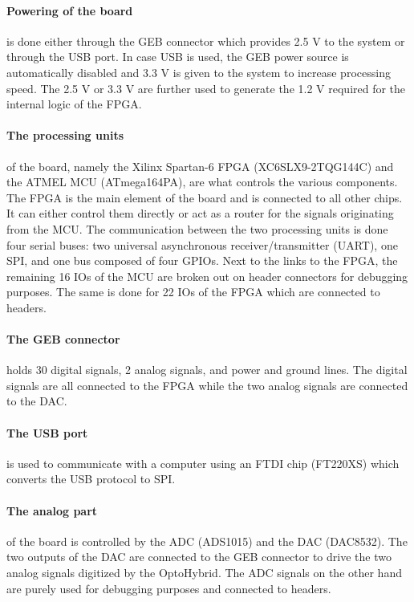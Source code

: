       \paragraph{Powering of the board} is done either through the GEB connector which provides 2.5 V to the system or through the USB port. In case USB is used, the GEB power source is automatically disabled and 3.3 V is given to the system to increase processing speed. The 2.5 V or 3.3 V are further used to generate the 1.2 V required for the internal logic of the FPGA.

      \paragraph{The processing units} of the board, namely the Xilinx Spartan-6 FPGA (XC6SLX9-2TQG144C) and the ATMEL MCU (ATmega164PA), are what controls the various components. The FPGA is the main element of the board and is connected to all other chips. It can either control them directly or act as a router for the signals originating from the MCU. The communication between the two processing units is done four serial buses: two universal asynchronous receiver/transmitter (UART), one SPI, and one bus composed of four GPIOs. Next to the links to the FPGA, the remaining 16 IOs of the MCU are broken out on header connectors for debugging purposes. The same is done for 22 IOs of the FPGA which are connected to headers.

      \paragraph{The GEB connector} holds 30 digital signals, 2 analog signals, and power and ground lines. The digital signals are all connected to the FPGA while the two analog signals are connected to the DAC.

      \paragraph{The USB port} is used to communicate with a computer using an FTDI chip (FT220XS) which converts the USB protocol to SPI.

      \paragraph{The analog part} of the board is controlled by the ADC (ADS1015) and the DAC (DAC8532). The two outputs of the DAC are connected to the GEB connector to drive the two analog signals digitized by the OptoHybrid. The ADC signals on the other hand are purely used for debugging purposes and connected to headers.

